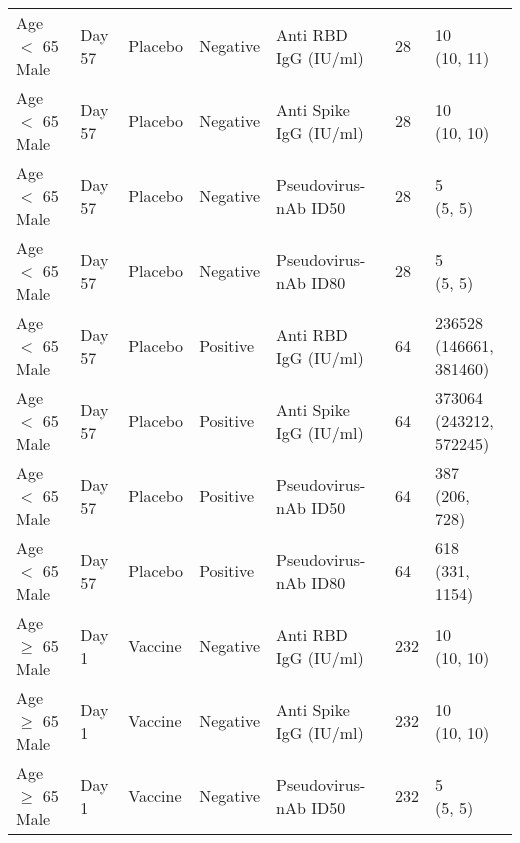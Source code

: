 \documentclass[]{book}
\theoremstyle{definition}
\theoremstyle{definition}
\theoremstyle{definition}
\newcommand{\1}{\mathbbm{1}}
\begin{document}
\begin{landscape}
\begin{ThreePartTable}
\begin{longtable}[t]{>{\raggedright\arraybackslash}p{7cm}llllll}
\hspace{1em}Age $<$ 65 Male & Day 57 & Placebo & Negative & Anti RBD IgG (IU/ml) & 28 & \makecell[l]{10\\(10, 11)}\\
\hspace{1em}Age $<$ 65 Male & Day 57 & Placebo & Negative & Anti Spike IgG (IU/ml) & 28 & \makecell[l]{10\\(10, 10)}\\
\hspace{1em}Age $<$ 65 Male & Day 57 & Placebo & Negative & Pseudovirus-nAb ID50 & 28 & \makecell[l]{5\\(5, 5)}\\
\hspace{1em}Age $<$ 65 Male & Day 57 & Placebo & Negative & Pseudovirus-nAb ID80 & 28 & \makecell[l]{5\\(5, 5)}\\
\hspace{1em}Age $<$ 65 Male & Day 57 & Placebo & Positive & Anti RBD IgG (IU/ml) & 64 & \makecell[l]{236528\\(146661, 381460)}\\
\hspace{1em}Age $<$ 65 Male & Day 57 & Placebo & Positive & Anti Spike IgG (IU/ml) & 64 & \makecell[l]{373064\\(243212, 572245)}\\
\hspace{1em}Age $<$ 65 Male & Day 57 & Placebo & Positive & Pseudovirus-nAb ID50 & 64 & \makecell[l]{387\\(206, 728)}\\
\hspace{1em}Age $<$ 65 Male & Day 57 & Placebo & Positive & Pseudovirus-nAb ID80 & 64 & \makecell[l]{618\\(331, 1154)}\\
\hspace{1em}Age $\geq$ 65 Male & Day 1 & Vaccine & Negative & Anti RBD IgG (IU/ml) & 232 & \makecell[l]{10\\(10, 10)}\\
\hspace{1em}Age $\geq$ 65 Male & Day 1 & Vaccine & Negative & Anti Spike IgG (IU/ml) & 232 & \makecell[l]{10\\(10, 10)}\\
\hspace{1em}Age $\geq$ 65 Male & Day 1 & Vaccine & Negative & Pseudovirus-nAb ID50 & 232 & \makecell[l]{5\\(5, 5)}\\

\end{longtable}
\end{ThreePartTable}
\end{landscape}
\end{document}
